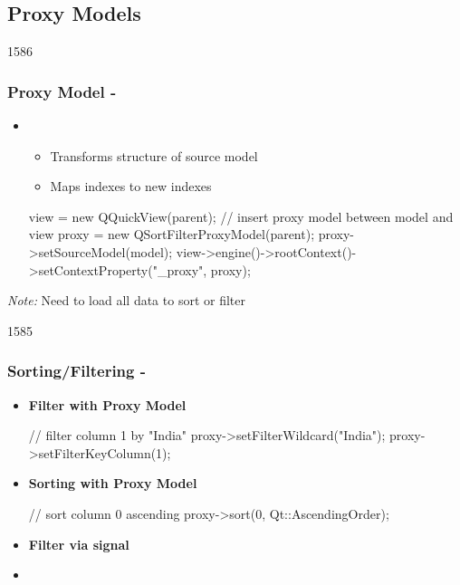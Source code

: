 %
%
%
%

\subsection{Proxy Models}
\begin{slide}[fragile]{1586}\frametitle{Proxy Model - }
  \begin{itemize}
  \item {}
    \begin{itemize}
    \item Transforms structure of source model
    \item Maps indexes to new indexes
    \end{itemize}
\begin{cpp}
view = new QQuickView(parent);
// insert proxy model between model and view
proxy = new QSortFilterProxyModel(parent);
proxy->setSourceModel(model);
view->engine()->rootContext()->setContextProperty("_proxy", proxy);
\end{cpp}
  \end{itemize}
\textit{Note:} Need to load all data to sort or filter
\end{slide}
\begin{slide}[fragile]{1585}\frametitle{Sorting/Filtering - }
  \begin{itemize}
  \item \textbf{Filter with Proxy Model}
\begin{cpp}
// filter column 1 by "India"
proxy->setFilterWildcard("India");
proxy->setFilterKeyColumn(1); 
\end{cpp}
\item \textbf{Sorting with Proxy Model}
\begin{cpp}
// sort column 0 ascending
proxy->sort(0, Qt::AscendingOrder);
\end{cpp}
  \end{itemize}
\medskip
\begin{itemize}
\item \textbf{Filter via  signal}
\item[]
\begin{qml}
\\
\\
\qtt{\}}\\
\end{qml}
\end{itemize}
\end{slide}

